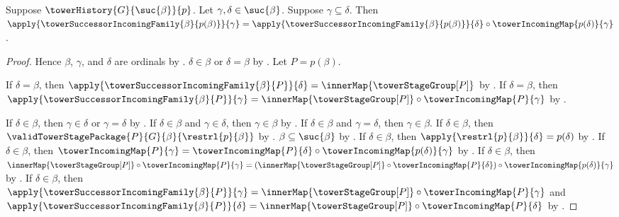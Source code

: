 \begin{proposition}\label{tower_successor_incoming_coherence}
    Suppose $\towerHistory{G}{\suc{\beta}}{p}$.
    Let $\gamma,\delta\in\suc{\beta}$.
    Suppose $\gamma\subseteq\delta$.
    Then $\apply{\towerSuccessorIncomingFamily{\beta}{p(\beta)}}
            {\gamma}
        =\apply{\towerSuccessorIncomingFamily{\beta}{p(\beta)}}
            {\delta}\circ
         \towerIncomingMap{p(\delta)}{\gamma}$.
\end{proposition}
\begin{proof}
    Hence $\beta$, $\gamma$, and $\delta$ are ordinals by
        .
    $\delta\in\beta$ or $\delta=\beta$ by .
    Let $P=p(\beta)$.

    If $\delta=\beta$, then
        $\apply{\towerSuccessorIncomingFamily{\beta}{P}}{\delta}
            =\innerMap{\towerStageGroup[P]}$ by
        .
    If $\delta=\beta$, then
        $\apply{\towerSuccessorIncomingFamily{\beta}{P}}{\gamma}
            =\innerMap{\towerStageGroup[P]}\circ
                \towerIncomingMap{P}{\gamma}$ by
        .

    If $\delta\in\beta$, then
        $\gamma\in\delta$ or $\gamma=\delta$ by
        .
    If $\delta\in\beta$ and $\gamma\in\delta$, then
        $\gamma\in\beta$ by .
    If $\delta\in\beta$ and $\gamma=\delta$, then
        $\gamma\in\beta$.
    If $\delta\in\beta$, then
        $\validTowerStagePackage{P}{G}{\beta}{\restrl{p}{\beta}}$ by
        .
    $\beta\subseteq\suc{\beta}$ by .
    If $\delta\in\beta$, then
        $\apply{\restrl{p}{\beta}}{\delta}=p(\delta)$ by
        .
    If $\delta\in\beta$, then
        $\towerIncomingMap{P}{\gamma}=
            \towerIncomingMap{P}{\delta}\circ
                \towerIncomingMap{p(\delta)}{\gamma}$ by
        .
    If $\delta\in\beta$, then
        $\innerMap{\towerStageGroup[P]}\circ
            \towerIncomingMap{P}{\gamma}
        =(\innerMap{\towerStageGroup[P]}\circ
            \towerIncomingMap{P}{\delta})\circ
                \towerIncomingMap{p(\delta)}{\gamma}$ by
        .
    If $\delta\in\beta$, then
        $\apply{\towerSuccessorIncomingFamily{\beta}{P}}{\gamma}
            =\innerMap{\towerStageGroup[P]}\circ
                \towerIncomingMap{P}{\gamma}$ and
        $\apply{\towerSuccessorIncomingFamily{\beta}{P}}{\delta}
            =\innerMap{\towerStageGroup[P]}\circ
                \towerIncomingMap{P}{\delta}$ by
        .
\end{proof}

